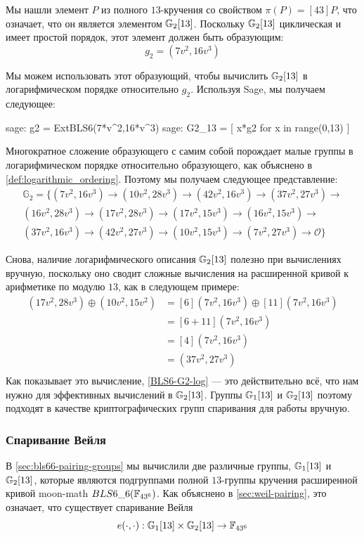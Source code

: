 Мы нашли элемент $P$ из полного $13$-кручения со свойством $\pi(P) = [43]P$, что означает, что он является элементом $\mathbb{G}_2[13]$. Поскольку $\mathbb{G}_2[13]$ циклическая и имеет простой порядок, этот элемент должен быть образующим:
\begin{equation}
g_{2} = (7v^2, 16v^3)
\end{equation}

Мы можем использовать этот образующий, чтобы вычислить $\mathbb{G}_2[13]$ в логарифмическом порядке относительно $g_{2}$. Используя Sage, мы получаем следующее:
\begin{sagecommandline}
sage: g2 = ExtBLS6(7*v^2,16*v^3)
sage: G2_13 = [ x*g2 for x in range(0,13) ]
\end{sagecommandline}
Многократное сложение образующего с самим собой порождает малые группы в логарифмическом порядке относительно образующего, как объяснено в \ref{def:logarithmic_ordering}. Поэтому мы получаем следующее представление:
\begin{multline}
\label{BLS6-G2-log}
\mathbb{G}_2=\{
(7v^2, 16v^3) \to
(10v^2, 28v^3)\to
(42v^2, 16v^3)\to
(37v^2, 27v^3)\to\\
(16v^2, 28v^3)\to
(17v^2, 28v^3)\to
(17v^2, 15v^3)\to
(16v^2, 15v^3)\to\\
(37v^2, 16v^3)\to
(42v^2, 27v^3)\to
(10v^2, 15v^3)\to
(7v^2, 27v^3)\to
\mathcal{O}\}
\end{multline}

Снова, наличие логарифмического описания $\mathbb{G}_2[13]$ полезно при вычислениях вручную, поскольку оно сводит сложные вычисления на расширенной кривой к арифметике по модулю $13$, как в следующем примере:
\begin{align*}
(17v^2,28v^3)\oplus (10v^2,15v^2)  & = [6](7v^2,16v^3)\oplus [11](7v^2,16v^3)\\
                      & = [6+11](7v^2,16v^3)\\
                      & = [4](7v^2,16v^3)\\
                      & = (37v^2,27v^3)\\
\end{align*}
Как показывает это вычисление, \ref{BLS6-G2-log} — это действительно всё, что нам нужно для эффективных вычислений в $\mathbb{G}_2[13]$. Группы $\mathbb{G}_1[13]$ и $\mathbb{G}_2[13]$ поэтому подходят в качестве криптографических групп спаривания для работы вручную. 

\subsubsection{Спаривание Вейля}
В \ref{sec:bls66-pairing-groups} мы вычислили две различные группы, $\mathbb{G}_1[13]$ и $\mathbb{G}_2[13]$, которые являются подгруппами полной $13$-группы кручения расширенной кривой moon-math $BLS6\_6(\mathbb{F}_{43^6})$. Как объяснено в \ref{sec:weil-pairing}, это означает, что существует спаривание Вейля 
\begin{equation}
\label{BLS6-weil-pairing}
e(\cdot,\cdot): \mathbb{G}_1[13]\times\mathbb{G}_2[13] \to \mathbb{F}_{43^6}
\end{equation}

